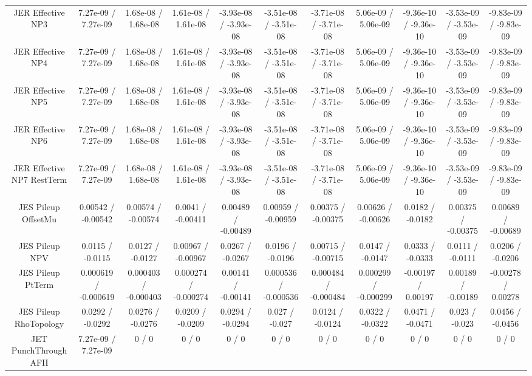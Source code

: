 \begin{table}[htbp]
\begin{center}
\begin{tabular}{|c|c|c|c|c|c|c|c|c|c|c|}
  JER Effective NP3 & 7.27e-09 / 7.27e-09 & 1.68e-08 / 1.68e-08 & 1.61e-08 / 1.61e-08 & -3.93e-08 / -3.93e-08 & -3.51e-08 / -3.51e-08 & -3.71e-08 / -3.71e-08 & 5.06e-09 / 5.06e-09 & -9.36e-10 / -9.36e-10 & -3.53e-09 / -3.53e-09 & -9.83e-09 / -9.83e-09 \\ 
  JER Effective NP4 & 7.27e-09 / 7.27e-09 & 1.68e-08 / 1.68e-08 & 1.61e-08 / 1.61e-08 & -3.93e-08 / -3.93e-08 & -3.51e-08 / -3.51e-08 & -3.71e-08 / -3.71e-08 & 5.06e-09 / 5.06e-09 & -9.36e-10 / -9.36e-10 & -3.53e-09 / -3.53e-09 & -9.83e-09 / -9.83e-09 \\ 
  JER Effective NP5 & 7.27e-09 / 7.27e-09 & 1.68e-08 / 1.68e-08 & 1.61e-08 / 1.61e-08 & -3.93e-08 / -3.93e-08 & -3.51e-08 / -3.51e-08 & -3.71e-08 / -3.71e-08 & 5.06e-09 / 5.06e-09 & -9.36e-10 / -9.36e-10 & -3.53e-09 / -3.53e-09 & -9.83e-09 / -9.83e-09 \\ 
  JER Effective NP6 & 7.27e-09 / 7.27e-09 & 1.68e-08 / 1.68e-08 & 1.61e-08 / 1.61e-08 & -3.93e-08 / -3.93e-08 & -3.51e-08 / -3.51e-08 & -3.71e-08 / -3.71e-08 & 5.06e-09 / 5.06e-09 & -9.36e-10 / -9.36e-10 & -3.53e-09 / -3.53e-09 & -9.83e-09 / -9.83e-09 \\ 
  JER Effective NP7 RestTerm & 7.27e-09 / 7.27e-09 & 1.68e-08 / 1.68e-08 & 1.61e-08 / 1.61e-08 & -3.93e-08 / -3.93e-08 & -3.51e-08 / -3.51e-08 & -3.71e-08 / -3.71e-08 & 5.06e-09 / 5.06e-09 & -9.36e-10 / -9.36e-10 & -3.53e-09 / -3.53e-09 & -9.83e-09 / -9.83e-09 \\ 
  JES Pileup OffsetMu & 0.00542 / -0.00542 & 0.00574 / -0.00574 & 0.0041 / -0.00411 & 0.00489 / -0.00489 & 0.00959 / -0.00959 & 0.00375 / -0.00375 & 0.00626 / -0.00626 & 0.0182 / -0.0182 & 0.00375 / -0.00375 & 0.00689 / -0.00689 \\ 
  JES Pileup NPV & 0.0115 / -0.0115 & 0.0127 / -0.0127 & 0.00967 / -0.00967 & 0.0267 / -0.0267 & 0.0196 / -0.0196 & 0.00715 / -0.00715 & 0.0147 / -0.0147 & 0.0333 / -0.0333 & 0.0111 / -0.0111 & 0.0206 / -0.0206 \\ 
  JES Pileup PtTerm & 0.000619 / -0.000619 & 0.000403 / -0.000403 & 0.000274 / -0.000274 & 0.00141 / -0.00141 & 0.000536 / -0.000536 & 0.000484 / -0.000484 & 0.000299 / -0.000299 & -0.00197 / 0.00197 & 0.00189 / -0.00189 & -0.00278 / 0.00278 \\ 
  JES Pileup RhoTopology & 0.0292 / -0.0292 & 0.0276 / -0.0276 & 0.0209 / -0.0209 & 0.0294 / -0.0294 & 0.027 / -0.027 & 0.0124 / -0.0124 & 0.0322 / -0.0322 & 0.0471 / -0.0471 & 0.023 / -0.023 & 0.0456 / -0.0456 \\ 
  JET PunchThrough AFII & 7.27e-09 / 7.27e-09 & 0 / 0 & 0 / 0 & 0 / 0 & 0 / 0 & 0 / 0 & 0 / 0 & 0 / 0 & 0 / 0 & 0 / 0 \\ 

\end{tabular}
\end{center}
\end{table}
